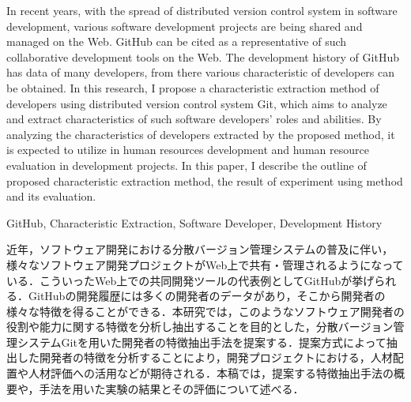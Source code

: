 \documentclass{funthesis}
\begin{document}
\maketitle       %
\begin{eabstract}
In recent years, with the spread of distributed version control system in software development, various software development projects are being shared and managed on the Web. GitHub can be cited as a representative of such collaborative development tools on the Web. The development history of GitHub has data of many developers, from there various characteristic of developers can be obtained. In this research, I propose a characteristic extraction method of developers using distributed version control system Git, which aims to analyze and extract characteristics of such software developers' roles and abilities. By analyzing the characteristics of developers extracted by the proposed method, it is expected to utilize in human resources development and human resource evaluation in development projects. In this paper, I describe the outline of proposed characteristic extraction method, the result of experiment using method and its evaluation.
\end{eabstract}

\begin{ekeyword}
GitHub, Characteristic Extraction, Software Developer, Development History\end{ekeyword}

\begin{jabstract}
近年，ソフトウェア開発における分散バージョン管理システムの普及に伴い，様々なソフトウェア開発プロジェクトがWeb上で共有・管理されるようになっている．こういったWeb上での共同開発ツールの代表例としてGitHubが挙げられる．GitHubの開発履歴には多くの開発者のデータがあり，そこから開発者の様々な特徴を得ることができる．本研究では，このようなソフトウェア開発者の役割や能力に関する特徴を分析し抽出することを目的とした，分散バージョン管理システムGitを用いた開発者の特徴抽出手法を提案する．提案方式によって抽出した開発者の特徴を分析することにより，開発プロジェクトにおける，人材配置や人材評価への活用などが期待される．本稿では，提案する特徴抽出手法の概要や，手法を用いた実験の結果とその評価について述べる．
\end{jabstract}
\end{document}
